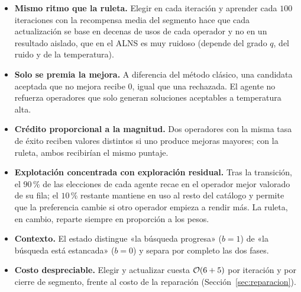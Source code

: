 \begin{itemize}
\item \textbf{Mismo ritmo que la ruleta.} Elegir en cada iteración y aprender cada $100$
iteraciones con la recompensa media del segmento hace que cada actualización se base en
decenas de usos de cada operador y no en un resultado aislado, que en el ALNS es muy ruidoso
(depende del grado $q$, del ruido y de la temperatura).
\item \textbf{Solo se premia la mejora.} A diferencia del método clásico, una candidata
aceptada que no mejora recibe $0$, igual que una rechazada. El agente no refuerza operadores
que solo generan soluciones aceptables a temperatura alta.
\item \textbf{Crédito proporcional a la magnitud.} Dos operadores con la misma tasa de éxito
reciben valores distintos si uno produce mejoras mayores; con la ruleta, ambos recibirían el
mismo puntaje.
\item \textbf{Explotación concentrada con exploración residual.} Tras la transición, el
$90$\,\% de las elecciones de cada agente recae en el operador mejor valorado de su fila; el
$10$\,\% restante mantiene en uso al resto del catálogo y permite que la preferencia cambie
si otro operador empieza a rendir más. La ruleta, en cambio, reparte siempre en proporción a
los pesos.
\item \textbf{Contexto.} El estado distingue «la búsqueda progresa» ($b=1$) de «la búsqueda
está estancada» ($b=0$) y separa por completo las dos fases.
\item \textbf{Costo despreciable.} Elegir y actualizar cuesta $\mathcal{O}(6+5)$ por iteración y por
cierre de segmento, frente al costo de la reparación (Sección~\ref{sec:reparacion}).
\end{itemize}

